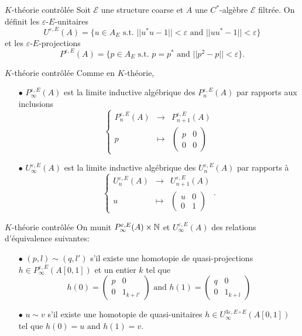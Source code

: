 \begin{frame}{$K$-théorie contrôlée}
Soit $\mathcal E$ une structure coarse et $A$ une $C^*$-algèbre $\mathcal E$ filtrée. On définit les $\varepsilon$-$E$-unitaires
\[U^{\varepsilon, E}(A)= \{u\in A_E \text{ s.t. } ||u^*u-1||<\varepsilon\text{ and }||uu^*-1||<\varepsilon \}\]
et les $\varepsilon$-$E$-projections 
\[P^{\varepsilon, E}(A)= \{p\in A_E \text{ s.t. } p=p^*\text{ and }||p^2-p||<\varepsilon \}.\]
\end{frame}

\begin{frame}{$K$-théorie contrôlée}
Comme en $K$-théorie, 
\begin{itemize}
\item[$\bullet$] $P_\infty^{\varepsilon, E}(A)$ est la limite inductive algébrique des $P_n^{\varepsilon, E}(A)$ par rapports aux inclusions
\[\left\{\begin{array}{rcl}
	P^{\varepsilon,E}_n(A) 		& \rightarrow	& P^{\varepsilon,E}_{n+1}(A)\\ 
	p 		& \mapsto 	& \begin{pmatrix}p& 0 \\ 0&0 \end{pmatrix}
\end{array}\right.\]
\item[$\bullet$] $U_\infty^{\varepsilon, E}(A)$ est la limite inductive algébrique des $U_n^{\varepsilon, E}(A)$ par rapports à
\[\left\{\begin{array}{rcl}
	U^{\varepsilon,E}_n(A) 		& \rightarrow	& U^{\varepsilon,E}_{n+1}(A)\\ 
	u 		& \mapsto 	& \begin{pmatrix}u & 0 \\ 0& 1 \end{pmatrix}
\end{array}\right. .\]
\end{itemize}
\end{frame}

\begin{frame}{$K$-théorie contrôlée}
On munit $P_\infty^{\varepsilon, E}(A)\times \mathbb N$ et $U_\infty^{\varepsilon, E}(A)$ des relations d'équivalence suivantes:
\begin{itemize}
\item[$\bullet$] $(p,l) \sim (q,l')$ s'il existe une homotopie de quasi-projections $h\in P^{\varepsilon, E}_\infty(A[0,1])$ et un entier $k$ tel que 
\[h(0)=\begin{pmatrix} p & 0 \\ 0 & 1_{k+l'} \end{pmatrix} \text{ and }
h(1)=\begin{pmatrix} q & 0 \\ 0 & 1_{k+l} \end{pmatrix}\]
\item[$\bullet$] $u \sim v$ s'il existe une homotopie de quasi-unitaires $h\in U^{3\varepsilon, E\circ E}_\infty(A[0,1])$ tel que $h(0)= u \text{ and }h(1)=v$.\\
\end{itemize}
\end{frame}

